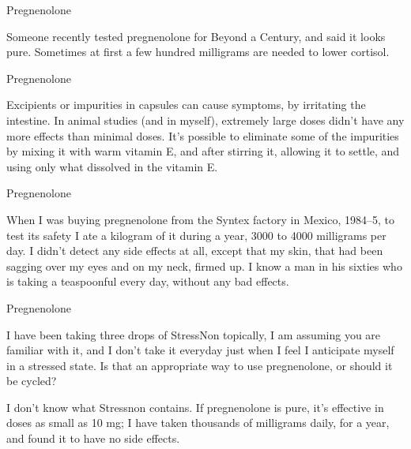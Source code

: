 \documentclass[11pt,oneside,openany,extrafontsizes]{memoir}
\begin{document}
\begin{standalonequote}{Pregnenolone}

    \begin{answer}
        Someone recently tested pregnenolone for Beyond a Century, and said it looks pure. Sometimes at first a few hundred milligrams are needed to lower cortisol.
    \end{answer}
\end{standalonequote}

\begin{standalonequote}{Pregnenolone}

    \begin{answer}
        Excipients or impurities in capsules can cause symptoms, by irritating the intestine. In animal studies (and in myself), extremely large doses didn't have any more effects than minimal doses. It's possible to eliminate some of the impurities by mixing it with warm vitamin E, and after stirring it, allowing it to settle, and using only what dissolved in the vitamin E.
    \end{answer}
\end{standalonequote}

\begin{standalonequote}{Pregnenolone}

    \begin{answer}
        When I was buying pregnenolone from the Syntex factory in Mexico, 1984--5, to test its safety I ate a kilogram of it during a year, 3000 to 4000 milligrams per day. I didn't detect any side effects at all, except that my skin, that had been sagging over my eyes and on my neck, firmed up. I know a man in his sixties who is taking a teaspoonful every day, without any bad effects.
    \end{answer}
\end{standalonequote}

\begin{qaexchange}{Pregnenolone}

    \begin{question}
        I have been taking three drops of StressNon topically, I am assuming you are familiar with it, and I don't take it everyday just when I feel I anticipate myself in a stressed state. Is that an appropriate way to use pregnenolone, or should it be cycled?
    \end{question}

    \begin{answer}
        I don't know what Stressnon contains. If pregnenolone is pure, it's effective in doses as small as 10 mg; I have taken thousands of milligrams daily, for a year, and found it to have no side effects.
    \end{answer}
\end{qaexchange}
\end{document}
